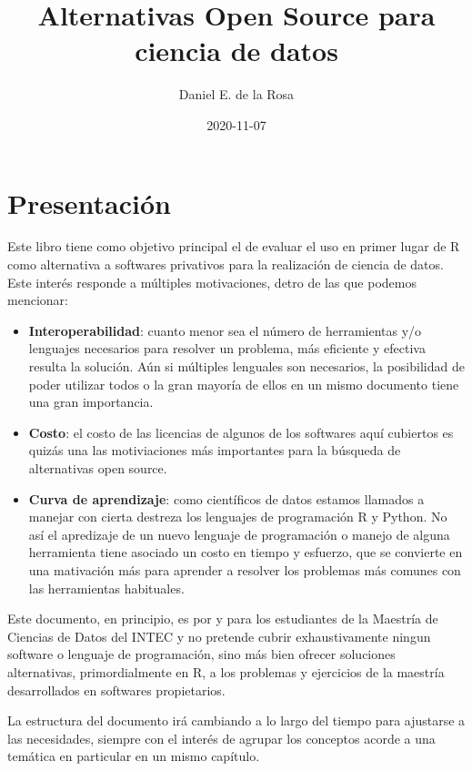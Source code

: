 \documentclass[
]{book}
\title{Alternativas Open Source para ciencia de datos}
\author{Daniel E. de la Rosa}
\date{2020-11-07}
\begin{document}
\maketitle

{
\setcounter{tocdepth}{1}
\tableofcontents
}
\hypertarget{presentaciuxf3n}{%
\chapter*{Presentación}\label{presentaciuxf3n}}

Este libro tiene como objetivo principal el de evaluar el uso en primer lugar de R como alternativa a softwares privativos para la realización de ciencia de datos. Este interés responde a múltiples motivaciones, detro de las que podemos mencionar:

\begin{itemize}
\item
  \textbf{Interoperabilidad}: cuanto menor sea el número de herramientas y/o lenguajes necesarios para resolver un problema, más eficiente y efectiva resulta la solución. Aún si múltiples lenguales son necesarios, la posibilidad de poder utilizar todos o la gran mayoría de ellos en un mismo documento tiene una gran importancia.
\item
  \textbf{Costo}: el costo de las licencias de algunos de los softwares aquí cubiertos es quizás una las motiviaciones más importantes para la búsqueda de alternativas open source.
\item
  \textbf{Curva de aprendizaje}: como científicos de datos estamos llamados a manejar con cierta destreza los lenguajes de programación R y Python. No así el apredizaje de un nuevo lenguaje de programación o manejo de alguna herramienta tiene asociado un costo en tiempo y esfuerzo, que se convierte en una mativación más para aprender a resolver los problemas más comunes con las herramientas habituales.
\end{itemize}

Este documento, en principio, es por y para los estudiantes de la Maestría de Ciencias de Datos del INTEC y no pretende cubrir exhaustivamente ningun software o lenguaje de programación, sino más bien ofrecer soluciones alternativas, primordialmente en R, a los problemas y ejercicios de la maestría desarrollados en softwares propietarios.

La estructura del documento irá cambiando a lo largo del tiempo para ajustarse a las necesidades, siempre con el interés de agrupar los conceptos acorde a una temática en particular en un mismo capítulo.
\end{document}
